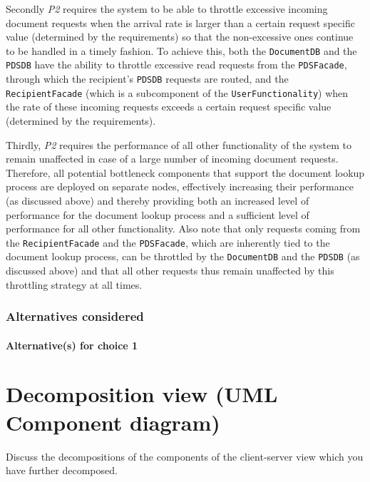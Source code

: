 \documentclass[a4paper,10pt]{article}
\begin{document}
Secondly \textit{P2} requires the system to be able to throttle excessive incoming document requests when the arrival rate is larger than a certain request specific value (determined by the requirements) so that the non-excessive ones continue to be handled in a timely fashion. To achieve this, both the \texttt{DocumentDB} and the \texttt{PDSDB} have the ability to throttle excessive read requests from the \texttt{PDSFacade}, through which the recipient's \texttt{PDSDB} requests are routed, and the \texttt{RecipientFacade} (which is a subcomponent of the \texttt{UserFunctionality}) when the rate of these incoming requests exceeds a certain request specific value (determined by the requirements).

Thirdly, \textit{P2} requires the performance of all other functionality of the system to remain unaffected in case of a large number of incoming document requests. Therefore, all potential bottleneck components that support the document lookup process are deployed on separate nodes, effectively increasing their performance (as discussed above) and thereby providing both an increased level of performance for the document lookup process and a sufficient level of performance for all other functionality. Also note that only requests coming from the \texttt{RecipientFacade} and the \texttt{PDSFacade}, which are inherently tied to the document lookup process, can be throttled by the \texttt{DocumentDB} and the \texttt{PDSDB} (as discussed above) and that all other requests thus remain unaffected by this throttling strategy at all times.
\subsubsection*{Alternatives considered}
\paragraph{Alternative(s) for choice 1}


\section{Decomposition view (UML Component diagram)}\label{sec:decomposition}
Discuss the decompositions of the components of the client-server view which
you have further decomposed.
\end{document}
